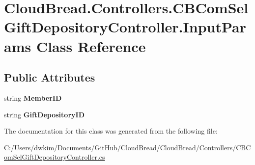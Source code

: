\hypertarget{a00114}{}\section{Cloud\+Bread.\+Controllers.\+C\+B\+Com\+Sel\+Gift\+Depository\+Controller.\+Input\+Params Class Reference}
\label{a00114}
\subsection*{Public Attributes}
\begin{DoxyCompactItemize}
\item 
string {\bfseries Member\+ID}\hypertarget{a00114_aa81d05e4817dd24ebb8b72902d663c4f}{}\label{a00114_aa81d05e4817dd24ebb8b72902d663c4f}

\item 
string {\bfseries Gift\+Depository\+ID}\hypertarget{a00114_a25af83f72b96c2aed31c58af0c3b85ac}{}\label{a00114_a25af83f72b96c2aed31c58af0c3b85ac}

\end{DoxyCompactItemize}


The documentation for this class was generated from the following file\+:\begin{DoxyCompactItemize}
\item 
C\+:/\+Users/dwkim/\+Documents/\+Git\+Hub/\+Cloud\+Bread/\+Cloud\+Bread/\+Controllers/\hyperlink{a00200}{C\+B\+Com\+Sel\+Gift\+Depository\+Controller.\+cs}\end{DoxyCompactItemize}
